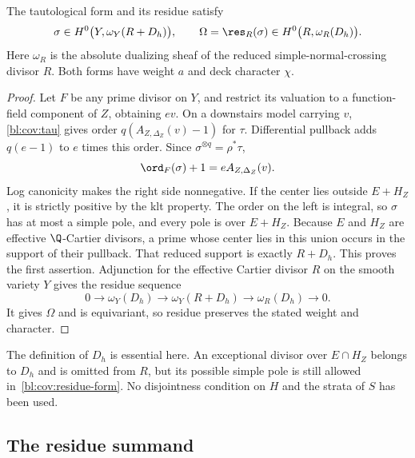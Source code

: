 \begin{lemma}\label{bl:cov:poles}
The tautological form and its residue satisfy
\begin{equation}\label{bl:cov:residue-form}
 \sigma\in H^0\bigl(Y,\omega_Y(R+D_h)\bigr),\qquad
 \Omega=\res_R(\sigma)\in H^0\bigl(R,\omega_R(D_h)\bigr).
\end{equation}
Here $\omega_R$ is the absolute dualizing sheaf of the reduced
simple-normal-crossing divisor $R$.  Both forms have weight $a$ and
deck character $\chi$.
\end{lemma}

\begin{proof}
Let $F$ be any prime divisor on $Y$, and restrict its valuation to a
function-field component of $Z$, obtaining $e v$.  On a downstairs
model carrying $v$, \eqref{bl:cov:tau} gives order
$q(A_{Z,\Delta_Z}(v)-1)$ for $\tau$.  Differential pullback adds
$q(e-1)$ to $e$ times this order.  Since $\sigma^{\otimes q}=\rho^*\tau$,
\begin{equation}\label{bl:cov:sigma-order}
 \ord_F(\sigma)+1=e A_{Z,\Delta_Z}(v).
\end{equation}
Log canonicity makes the right side nonnegative.  If the center lies
outside $E+H_Z$, it is strictly positive by the klt property.
The order on the left is integral, so $\sigma$ has at most a simple
pole, and every pole is over $E+H_Z$.  Because $E$ and $H_Z$ are
effective $\Q$-Cartier divisors, a prime whose center lies in this
union occurs in the support of their pullback.  That reduced support
is exactly $R+D_h$.  This proves the first assertion.  Adjunction for
the effective Cartier divisor $R$ on the smooth variety $Y$ gives
the residue sequence
\begin{equation}\label{bl:cov:residue-sequence}
 0\longrightarrow\omega_Y(D_h)
 \longrightarrow\omega_Y(R+D_h)
 \longrightarrow\omega_R(D_h)\longrightarrow0.
\end{equation}
It gives $\Omega$ and is equivariant, so residue preserves the stated
weight and character.
\end{proof}

The definition of $D_h$ is essential here.  An exceptional divisor
over $E\cap H_Z$ belongs to $D_h$ and is omitted from $R$, but its
possible simple pole is still allowed in~\eqref{bl:cov:residue-form}.
No disjointness condition on $H$ and the strata of $S$ has been used.

\subsection{The residue summand}

